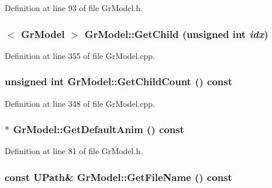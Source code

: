 Definition at line 93 of file GrModel.h.\hypertarget{class_gr_model_462d3723b7fe4909bc9a92b3fcb0028c}{
\subsubsection[{GetChild}]{$<$ {\bf GrModel} $>$ GrModel::GetChild (unsigned int {\em idx})}}
\label{class_gr_model_462d3723b7fe4909bc9a92b3fcb0028c}




Definition at line 355 of file GrModel.cpp.\hypertarget{class_gr_model_0d67f658382989a2dc3744dc88b28c22}{
\subsubsection[{GetChildCount}]{\setlength{\rightskip}{0pt plus 5cm}unsigned int GrModel::GetChildCount () const}}
\label{class_gr_model_0d67f658382989a2dc3744dc88b28c22}




Definition at line 348 of file GrModel.cpp.\hypertarget{class_gr_model_a9b644ea4efa86b73299934940c8b155}{
\subsubsection[{GetDefaultAnim}]{$\ast$ GrModel::GetDefaultAnim () const}}
\label{class_gr_model_a9b644ea4efa86b73299934940c8b155}




Definition at line 81 of file GrModel.h.\hypertarget{class_gr_model_390da9636c9c396d1fa3241b72ff6166}{
\subsubsection[{GetFileName}]{\setlength{\rightskip}{0pt plus 5cm}const {\bf UPath}\& GrModel::GetFileName () const}}
\label{class_gr_model_390da9636c9c396d1fa3241b72ff6166}




